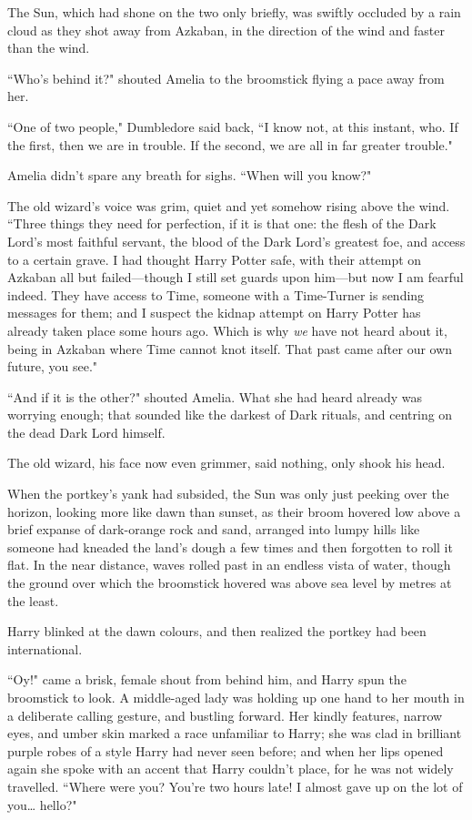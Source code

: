 \later

The Sun, which had shone on the two only briefly, was swiftly occluded by a rain cloud as they shot away from Azkaban, in the direction of the wind and faster than the wind.

``Who's behind it?" shouted Amelia to the broomstick flying a pace away from her.

``One of two people," Dumbledore said back, ``I know not, at this instant, who. If the first, then we are in trouble. If the second, we are all in far greater trouble."

Amelia didn't spare any breath for sighs. ``When will you know?"

The old wizard's voice was grim, quiet and yet somehow rising above the wind. ``Three things they need for perfection, if it is that one: the flesh of the Dark Lord's most faithful servant, the blood of the Dark Lord's greatest foe, and access to a certain grave. I had thought Harry Potter safe, with their attempt on Azkaban all but failed—though I still set guards upon him—but now I am fearful indeed. They have access to Time, someone with a Time-Turner is sending messages for them; and I suspect the kidnap attempt on Harry Potter has already taken place some hours ago. Which is why \emph{we} have not heard about it, being in Azkaban where Time cannot knot itself. That past came after our own future, you see."

``And if it is the other?" shouted Amelia. What she had heard already was worrying enough; that sounded like the darkest of Dark rituals, and centring on the dead Dark Lord himself.

The old wizard, his face now even grimmer, said nothing, only shook his head.

\later

When the portkey's yank had subsided, the Sun was only just peeking over the horizon, looking more like dawn than sunset, as their broom hovered low above a brief expanse of dark-orange rock and sand, arranged into lumpy hills like someone had kneaded the land's dough a few times and then forgotten to roll it flat. In the near distance, waves rolled past in an endless vista of water, though the ground over which the broomstick hovered was above sea level by metres at the least.

Harry blinked at the dawn colours, and then realized the portkey had been international.

``Oy!" came a brisk, female shout from behind him, and Harry spun the broomstick to look. A middle-aged lady was holding up one hand to her mouth in a deliberate calling gesture, and bustling forward. Her kindly features, narrow eyes, and umber skin marked a race unfamiliar to Harry; she was clad in brilliant purple robes of a style Harry had never seen before; and when her lips opened again she spoke with an accent that Harry couldn't place, for he was not widely travelled. ``Where were you? You're two hours late! I almost gave up on the lot of you{\ldots} hello?"

